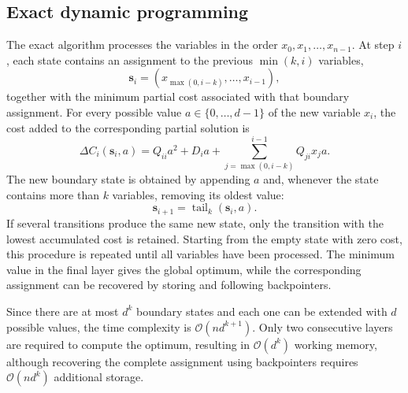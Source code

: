 \documentclass[%
 reprint,
 amsmath,amssymb,
 aps,
 pra,showkeys,
]{revtex4-2}
\begin{document}
\subsection{Exact dynamic programming}\label{ssec:exact dynamic}
The exact algorithm processes the variables in the order
$x_0,x_1,\ldots,x_{n-1}$. At step $i$, each state contains an assignment
to the previous $\min(k,i)$ variables,
\begin{equation}
    \mathbf{s}_i =
    \left(x_{\max(0,i-k)},\ldots,x_{i-1}\right),
\end{equation}
together with the minimum partial cost associated with that boundary
assignment. For every possible value $a\in\{0,\ldots,d-1\}$ of the new
variable $x_i$, the cost added to the corresponding partial solution is
\begin{equation}
    \Delta C_i(\mathbf{s}_i,a)
    =
    Q_{ii}a^2 + D_i a
    +
    \sum_{j=\max(0,i-k)}^{i-1}Q_{ji}x_j a .
    \label{eq:dp-increment}
\end{equation}
The new boundary state is obtained by appending $a$ and, whenever the
state contains more than $k$ variables, removing its oldest value:
\begin{equation}
    \mathbf{s}_{i+1}
    =
    \operatorname{tail}_k(\mathbf{s}_i,a).
\end{equation}
If several transitions produce the same new state, only the transition
with the lowest accumulated cost is retained. Starting from the empty
state with zero cost, this procedure is repeated until all variables
have been processed. The minimum value in the final layer gives the
global optimum, while the corresponding assignment can be recovered by
storing and following backpointers.

Since there are at most $d^k$
boundary states and each one can be extended with $d$ possible values,
the time complexity is $\mathcal{O}(nd^{k+1})$. Only two consecutive
layers are required to compute the optimum, resulting in
$\mathcal{O}(d^k)$ working memory, although recovering the complete
assignment using backpointers requires $\mathcal{O}(nd^k)$ additional
storage.
\end{document}
